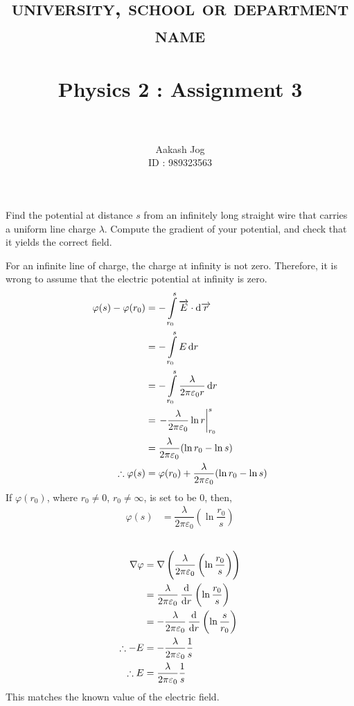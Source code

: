 \documentclass[fleqn, a4paper, 10pt, oneside]{scrartcl}
\title
{	
	\normalfont \normalsize 
	\textsc{university, school or department name} \\ [25pt] %
	\horrule{0.5pt} \\[0.4cm] %
	\huge Physics 2 : Assignment 3 \\ %
	\horrule{2pt} \\[0.5cm] %
}
\author
{
	Aakash Jog\\
	ID : 989323563
}
\date{\formatdate{15}{4}{2015}}
\theoremstyle{definition}
\theoremstyle{theorem}
\begin{document}
\maketitle

\begin{question}
	Find the potential at distance $s$ from an infinitely long straight wire that carries a uniform line charge $\lambda$.
	Compute the gradient of your potential, and check that it yields the correct field.
\end{question}

\begin{solution}
	For an infinite line of charge, the charge at infinity is not zero.
	Therefore, it is wrong to assume that the electric potential at infinity is zero.
	\begin{align*}
		\varphi(s) - \varphi(r_0) &= -\int\limits_{r_0}^{s} \overrightarrow{E} \cdot \dif \overrightarrow{r}\\
		&= - \int\limits_{r_0}^{s} E \dif r\\
		&= - \int\limits_{r_0}^{s} \dfrac{\lambda}{2 \pi \varepsilon_0 r} \dif r\\
		&= \left. - \dfrac{\lambda}{2 \pi \varepsilon_0} \ln r \right|_{r_0}^{s}\\
		&= \dfrac{\lambda}{2 \pi \varepsilon_0} (\ln r_0 - \ln s)\\
		\therefore \varphi(s) &= \varphi(r_0) + \dfrac{\lambda}{2 \pi \varepsilon_0} (\ln r_0 - \ln s)
	\end{align*}
	If $\varphi(r_0)$, where $r_0 \neq 0$, $r_0 \neq \infty$, is set to be $0$, then,
	\begin{align*}
		\varphi(s) &= \dfrac{\lambda}{2 \pi \varepsilon_0} \left( \ln \dfrac{r_0}{s} \right)
	\end{align*}
	~\\
	\begin{align*}
		\nabla \varphi &= \nabla \left( \dfrac{\lambda}{2 \pi \varepsilon_0} \left( \ln \dfrac{r_0}{s} \right) \right)\\
		&= \dfrac{\lambda}{2 \pi \varepsilon_0} \dod{}{r} \left( \ln \dfrac{r_0}{s} \right)\\
		&= -\dfrac{\lambda}{2 \pi \varepsilon_0} \dod{}{r} \left( \ln \dfrac{s}{r_0} \right)\\
		\therefore -E &= -\dfrac{\lambda}{2 \pi \varepsilon_0} \dfrac{1}{s}\\
		\therefore E &= \dfrac{\lambda}{2 \pi \varepsilon_0} \dfrac{1}{s}
	\end{align*}
	This matches the known value of the electric field.
\end{solution}
\end{document}
